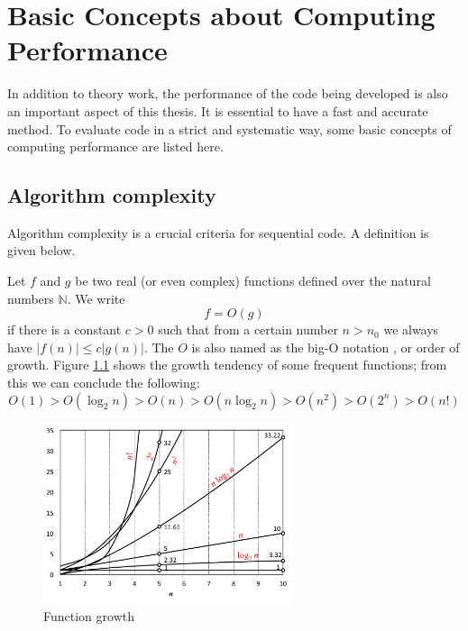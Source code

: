 
\chapter{Basic Concepts about Computing Performance\label{chpt:computing-performance}}

In addition to theory work, the performance of the code being
developed is also an important aspect of this thesis. It is essential
to have a fast and accurate method. To evaluate code in a strict and
systematic way, some basic concepts of computing performance are listed
here. 

\section{Algorithm complexity}

Algorithm complexity is a crucial criteria for sequential code. A
definition is given below.

Let $f$ and $g$ be two real (or even complex) functions defined
over the natural numbers $\mathbb{N}$. We write
\begin{equation}
f=O(g)
\end{equation}
if there is a constant $c>0$ such that from a certain number $n>n_{0}$
we always have $\left|f(n)\right|\leq c\left|g(n)\right|$. The $O$
is also named as the big-O notation \citep{Complexity}, or order
of growth. Figure \ref{fig:order-of-growth} shows the growth tendency
of some frequent functions; from this we can conclude the following:
\begin{equation}
O(1)>O(\log_{2}n)>O(n)>O(n\log_{2}n)>O(n^{2})>O(2^{n})>O(n!)
\end{equation}

\begin{figure}[h]
\begin{centering}
\includegraphics[width=0.65\textwidth]{_figure/orders-of-growth}
\par\end{centering}
\caption{Function growth\label{fig:order-of-growth}}
\end{figure}


